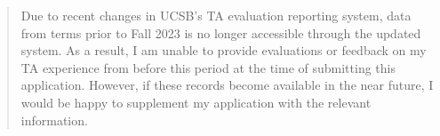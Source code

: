 \begin{quote}

    Due to recent changes in UCSB's TA evaluation reporting system, data from terms prior to Fall 2023 is no longer accessible through the updated system. As a result, I am unable to provide evaluations or feedback on my TA experience from before this period at the time of submitting this application. However, if these records become available in the near future, I would be happy to supplement my application with the relevant information.

\end{quote}
